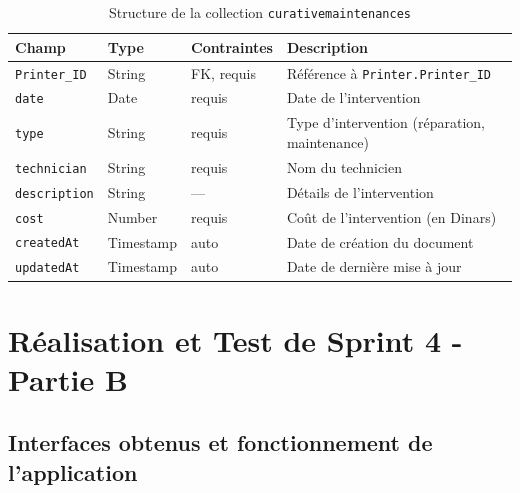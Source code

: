 \documentclass[a4paper,11pt]{report}
\begin{document}
\vspace{1em}  

\begin{table}[H]
  \centering
  \small
  \caption{Structure de la collection \texttt{curativemaintenances}}
  \label{tab:curative-schema}
  \begin{tabularx}{\textwidth}{l X l X}
    \toprule
    \bf Champ            & \bf Type      & \bf Contraintes         & \bf Description                              \\
    \midrule
    \texttt{Printer\_ID}       & String       & FK, requis             & Référence à \texttt{Printer.Printer\_ID}      \\
    \addlinespace
    \texttt{date}        & Date         & requis                 & Date de l’intervention                        \\
    \addlinespace
    \texttt{type}        & String       & requis                 & Type d’intervention (réparation, maintenance) \\
    \addlinespace
    \texttt{technician}  & String       & requis                 & Nom du technicien                             \\
    \addlinespace
    \texttt{description} & String       & —                       & Détails de l’intervention                      \\
    \addlinespace
    \texttt{cost}        & Number       & requis                 & Coût de l’intervention (en Dinars)             \\
    \addlinespace
    \texttt{createdAt}   & Timestamp    & auto                    & Date de création du document                   \\
    \addlinespace
    \texttt{updatedAt}   & Timestamp    & auto                    & Date de dernière mise à jour                   \\
    \bottomrule
  \end{tabularx}
\end{table}

\section{Réalisation et Test de Sprint 4 - Partie B}


\subsection{Interfaces obtenus et fonctionnement de l'application}
\end{document}

